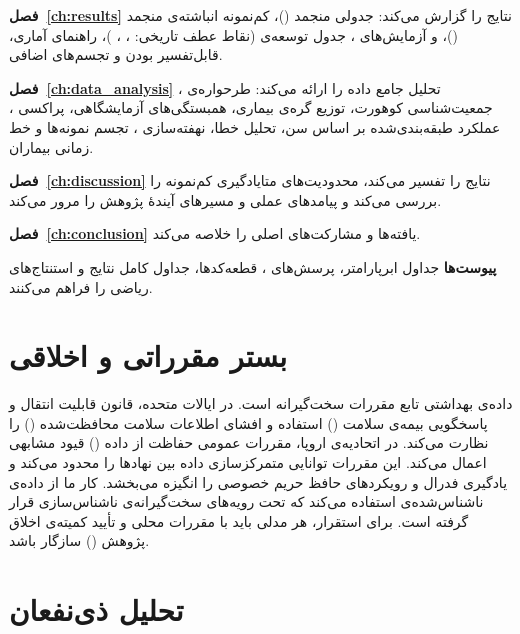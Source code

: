 \textbf{فصل~\ref{ch:results}} نتایج را گزارش می‌کند:  جدولی منجمد (\textbf{})، کم‌نمونه انباشته‌ی منجمد (\textbf{})،  و آزمایش‌های ، جدول توسعه‌ی  (نقاط عطف تاریخی: ، ، )، راهنمای آماری، قابل‌تفسیر بودن و تجسم‌های اضافی.

\textbf{فصل~\ref{ch:data_analysis}} تحلیل جامع داده را ارائه می‌کند: طرحواره‌ی ، جمعیت‌شناسی کوهورت، توزیع گره‌ی بیماری، همبستگی‌های آزمایشگاهی، پراکسی ، عملکرد طبقه‌بندی‌شده بر اساس سن، تحلیل خطا، نهفته‌سازی ، تجسم نمونه‌ها و خط زمانی بیماران.

\textbf{فصل~\ref{ch:discussion}} نتایج را تفسیر می‌کند، محدودیت‌های متایادگیری کم‌نمونه را بررسی می‌کند و پیامدهای عملی و مسیرهای آیندۀ پژوهش را مرور می‌کند.

\textbf{فصل~\ref{ch:conclusion}} یافته‌ها و مشارکت‌های اصلی را خلاصه می‌کند.

\textbf{پیوست‌ها} جداول ابرپارامتر، پرسش‌های  ، قطعه‌کدها، جداول کامل نتایج و استنتاج‌های ریاضی را فراهم می‌کنند.

\section{بستر مقرراتی و اخلاقی}

داده‌ی بهداشتی تابع مقررات سخت‌گیرانه است. در ایالات متحده، قانون قابلیت انتقال و پاسخگویی بیمه‌ی سلامت () استفاده و افشای اطلاعات سلامت محافظت‌شده () را نظارت می‌کند. در اتحادیه‌ی اروپا، مقررات عمومی حفاظت از داده () قیود مشابهی اعمال می‌کند. این مقررات توانایی متمرکزسازی داده بین نهادها را محدود می‌کند و یادگیری فدرال و رویکردهای حافظ حریم خصوصی را انگیزه می‌بخشد. کار ما از داده‌ی ناشناس‌شده‌ی  استفاده می‌کند که تحت رویه‌های سخت‌گیرانه‌ی ناشناس‌سازی قرار گرفته است. برای استقرار، هر مدلی باید با مقررات محلی و تأیید کمیته‌ی اخلاق پژوهش () سازگار باشد.

\section{تحلیل ذی‌نفعان}

